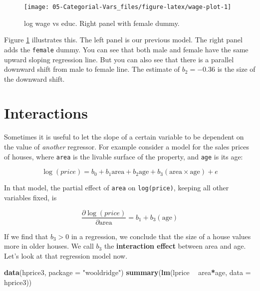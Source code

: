 \documentclass[]{book}
\newenvironment{Shaded}{\begin{snugshade}}{\end{snugshade}}
\newcommand{\KeywordTok}[1]{\textcolor[rgb]{0.13,0.29,0.53}{\textbf{#1}}}
\newcommand{\DataTypeTok}[1]{\textcolor[rgb]{0.13,0.29,0.53}{#1}}
\newcommand{\StringTok}[1]{\textcolor[rgb]{0.31,0.60,0.02}{#1}}
\newcommand{\OperatorTok}[1]{\textcolor[rgb]{0.81,0.36,0.00}{\textbf{#1}}}
\newcommand{\NormalTok}[1]{#1}
\begin{document}
\begin{figure}

{\centering \texttt{[image: 05-Categorial-Vars\_files/figure-latex/wage-plot-1]} 

}

\caption{log wage vs educ. Right panel with female dummy.}\label{fig:wage-plot}
\end{figure}

Figure \ref{fig:wage-plot} illustrates this. The left panel is our
previous model. The right panel adds the \texttt{female} dummy. You can
see that both male and female have the same upward sloping regression
line. But you can also see that there is a parallel downward shift from
male to female line. The estimate of \(b_2 = -0.36\) is the size of the
downward shift.

\section{Interactions}\label{interactions}

Sometimes it is useful to let the slope of a certain variable to be
dependent on the value of \emph{another} regressor. For example consider
a model for the sales prices of houses, where \texttt{area} is the
livable surface of the property, and \texttt{age} is its age:

\begin{equation}
\log(price) = b_0 + b_1 \text{area} + b_2 \text{age} + b_3 (\text{area} \times \text{age}) + e  \label{eq:price-interact}
\end{equation}

In that model, the partial effect of \texttt{area} on
\texttt{log(price)}, keeping all other variables fixed, is

\begin{equation}
\frac{\partial \log(price)}{\partial \text{area}} = b_1 + b_3 (\text{age}) 
\end{equation}

If we find that \(b_3 > 0\) in a regression, we conclude that the size
of a house values more in older houses. We call \(b_3\) the
\textbf{interaction effect} between area and age. Let's look at that
regression model now.

\begin{Shaded}
\begin{Highlighting}[]
\KeywordTok{data}\NormalTok{(hprice3, }\DataTypeTok{package =} \StringTok{"wooldridge"}\NormalTok{)}
\KeywordTok{summary}\NormalTok{(}\KeywordTok{lm}\NormalTok{(lprice }\OperatorTok{~}\StringTok{ }\NormalTok{area}\OperatorTok{*}\NormalTok{age, }\DataTypeTok{data =}\NormalTok{ hprice3))}
\end{Highlighting}
\end{Shaded}
\end{document}
